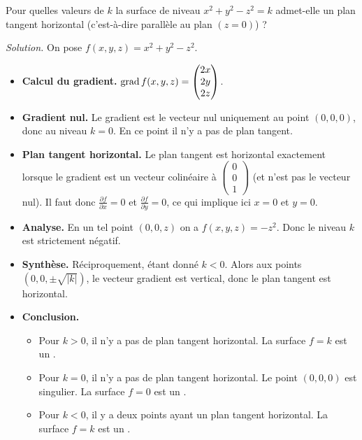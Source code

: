 \documentclass[12pt, class=report,crop=false]{standalone}
\begin{document}
\begin{exemple}
Pour quelles valeurs de $k$ la surface de niveau $x^2+y^2-z^2=k$ admet-elle un plan tangent horizontal (c'est-à-dire parallèle au plan $(z=0)$) ?

\emph{Solution.}
On pose $f(x,y,z) = x^2+y^2-z^2$.
\begin{itemize}
  \item \textbf{Calcul du gradient.}   
  $\operatorname{grad} f (x,y,z) = \begin{pmatrix}2x\\2y\\2z\end{pmatrix}$.
  
  \item \textbf{Gradient nul.} Le gradient est le vecteur nul uniquement au point $(0,0,0)$, donc au niveau $k=0$. En ce point il n'y a pas de plan tangent.
  
  \item \textbf{Plan tangent horizontal.}  
  Le plan tangent est horizontal exactement lorsque le gradient est un vecteur colinéaire à $\left(\begin{smallmatrix}0\\0\\1\end{smallmatrix}\right)$ (et n'est pas le vecteur nul).
  Il faut donc $\frac{\partial f}{\partial x} = 0$ et $\frac{\partial f}{\partial y} = 0$, ce qui implique ici $x=0$ et $y=0$.
  
  \item \textbf{Analyse.}
  En un tel point $(0,0,z)$ on a $f(x,y,z)=-z^2$. Donc le niveau $k$ est strictement négatif.
  
  \item \textbf{Synthèse.} Réciproquement, étant donné $k<0$. Alors aux points $(0,0,\pm\sqrt{|k|})$, le vecteur gradient est vertical, donc le plan tangent est horizontal.
  
  \item \textbf{Conclusion.}
  \begin{itemize} 
    \item Pour $k>0$, il n'y a pas de plan tangent horizontal. La surface $f=k$ est un . 
    
    \item Pour $k=0$, il n'y a pas de plan tangent horizontal. Le point $(0,0,0)$ est singulier. La surface $f=0$ est un . 
    
    \item Pour $k<0$, il y a deux points ayant un plan tangent horizontal. La surface $f=k$ est un .   
    

\end{itemize}
\end{itemize}
\end{exemple}
\end{document}
